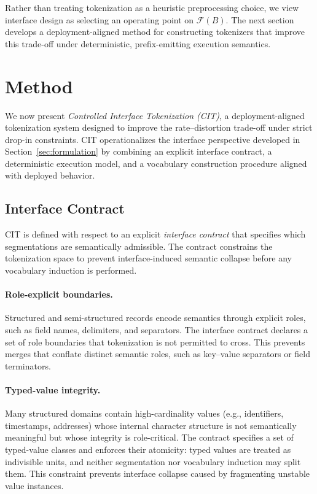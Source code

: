 Rather than treating tokenization as a heuristic preprocessing choice, we view interface design as selecting an operating point on $\mathcal{F}(B)$.
The next section develops a deployment-aligned method for constructing tokenizers that improve this trade-off under deterministic, prefix-emitting execution semantics.

\section{Method}
\label{sec:method}

We now present \emph{Controlled Interface Tokenization (CIT)}, a deployment-aligned tokenization system designed to improve the rate--distortion trade-off under strict drop-in constraints.
CIT operationalizes the interface perspective developed in Section~\ref{sec:formulation} by combining an explicit interface contract, a deterministic execution model, and a vocabulary construction procedure aligned with deployed behavior.

\subsection{Interface Contract}
\label{sec:contract}

CIT is defined with respect to an explicit \emph{interface contract} that specifies which segmentations are semantically admissible.
The contract constrains the tokenization space to prevent interface-induced semantic collapse before any vocabulary induction is performed.

\paragraph{Role-explicit boundaries.}
Structured and semi-structured records encode semantics through explicit roles, such as field names, delimiters, and separators.
The interface contract declares a set of role boundaries that tokenization is not permitted to cross.
This prevents merges that conflate distinct semantic roles, such as key--value separators or field terminators.

\paragraph{Typed-value integrity.}
Many structured domains contain high-cardinality values (e.g., identifiers, timestamps, addresses) whose internal character structure is not semantically meaningful but whose integrity is role-critical.
The contract specifies a set of typed-value classes and enforces their atomicity: typed values are treated as indivisible units, and neither segmentation nor vocabulary induction may split them.
This constraint prevents interface collapse caused by fragmenting unstable value instances.

